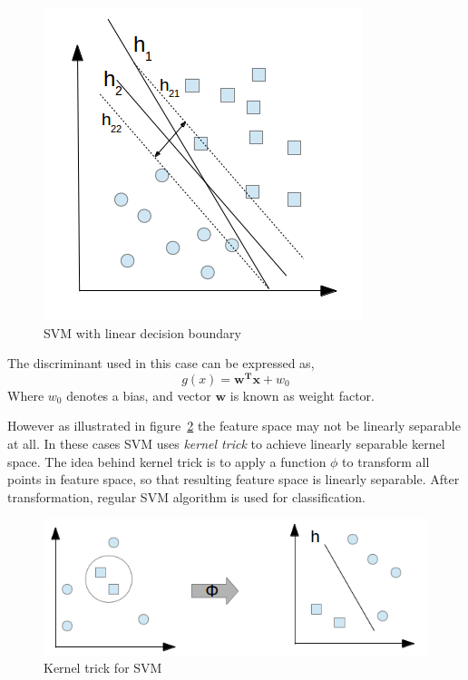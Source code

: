 \begin{figure}[h]
  \begin{center}
    \captionsetup{justification=centering}
    \includegraphics[scale=0.45]{figures/svm1.png}
    \caption{SVM with linear decision boundary}
    \label{fig:svm1}
  \end{center}
\end{figure}
The discriminant used in this case can be expressed as,
\[g(x) = \boldsymbol{w^T}\boldsymbol{x} + w_0 \]
Where $w_0$ denotes a bias, and vector $\boldsymbol{w}$ is known as weight factor.

However as illustrated in figure~\ref{fig:svm2} the feature space may not be linearly separable at all. In these cases SVM uses \emph{kernel trick} to achieve linearly separable kernel space. The idea behind kernel trick is to apply a function $\phi$ to transform all points in feature space, so that resulting feature space is linearly separable. After transformation, regular SVM algorithm is used for classification.

\begin{figure}[h]
  \begin{center}
    \captionsetup{justification=centering}
    \includegraphics[scale=0.45]{figures/svm2.png}
    \caption{Kernel trick for SVM}
    \label{fig:svm2}
  \end{center}
\end{figure}

